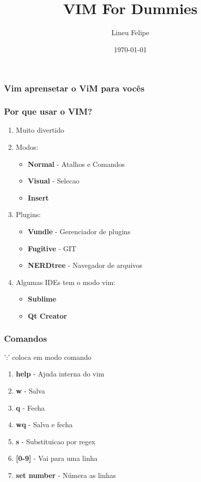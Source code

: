 \documentclass[aspectratio=169]{beamer}
\title[\sc{VIM For Dummies}]{VIM For Dummies}
\author[Lineu Felipe]{Lineu Felipe}
\institute{Socialbase} %
\date{\today}
\begin{document}
\begin{frame}\frametitle{Vim aprensetar o ViM para vocês}
    \pause
\end{frame}

\begin{frame}
    \titlepage
\end{frame}

\begin{frame}\frametitle{Por que usar o VIM?}
    \pause
    \begin{enumerate}
        \item<1-> Muito divertido \pause
        \item<2-> Modos:
            \begin{itemize}
                \item \textbf{Normal} - Atalhos e Comandos
                \item \textbf{Visual} - Selecao
                \item \textbf{Insert}
            \end{itemize}
            \pause
        \item<3-> Plugins:
            \begin{itemize}
                \item \textbf{Vundle} - Gerenciador de plugins
                \item \textbf{Fugitive} - GIT
                \item \textbf{NERDtree} - Navegador de arquivos
            \end{itemize}
            \pause
        \item<4-> Algumas IDEs tem o modo vim:
            \begin{itemize}
                \item \textbf{Sublime}
                \item \textbf{Qt Creator}
            \end{itemize}
    \end{enumerate}
\end{frame}

\begin{frame}\frametitle{Comandos}
    ':' coloca em modo comando
    \begin{enumerate}
        \item \textbf{help} - Ajuda interna do vim
        \item \textbf{w} - Salva
        \item \textbf{q} - Fecha
        \item \textbf{wq} - Salva e fecha
        \item \textbf{s} - Substituicao por regex
        \item \textbf{[0-9]} - Vai para uma linha
        \item \textbf{set number} - Númera as linhas
    \end{enumerate}
\end{frame}
\end{document}
